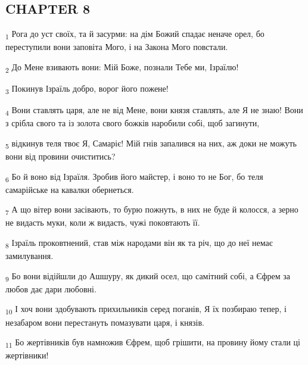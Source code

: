 \subsection{CHAPTER 8}
\begin{tcolorbox}
\textsubscript{1} Рога до уст своїх, та й засурми: на дім Божий спадає неначе орел, бо переступили вони заповіта Мого, і на Закона Мого повстали.
\end{tcolorbox}
\begin{tcolorbox}
\textsubscript{2} До Мене взивають вони: Мій Боже, познали Тебе ми, Ізраїлю!
\end{tcolorbox}
\begin{tcolorbox}
\textsubscript{3} Покинув Ізраїль добро, ворог його пожене!
\end{tcolorbox}
\begin{tcolorbox}
\textsubscript{4} Вони ставлять царя, але не від Мене, вони князя ставлять, але Я не знаю! Вони з срібла свого та із золота свого божків наробили собі, щоб загинути,
\end{tcolorbox}
\begin{tcolorbox}
\textsubscript{5} відкинув теля твоє Я, Самаріє! Мій гнів запалився на них, аж доки не можуть вони від провини очиститись?
\end{tcolorbox}
\begin{tcolorbox}
\textsubscript{6} Бо й воно від Ізраїля. Зробив його майстер, і воно то не Бог, бо теля самарійське на кавалки обернеться.
\end{tcolorbox}
\begin{tcolorbox}
\textsubscript{7} А що вітер вони засівають, то бурю пожнуть, в них не буде й колосся, а зерно не видасть муки, коли ж видасть, чужі поковтають її.
\end{tcolorbox}
\begin{tcolorbox}
\textsubscript{8} Ізраїль проковтнений, став між народами він як та річ, що до неї немає замилування.
\end{tcolorbox}
\begin{tcolorbox}
\textsubscript{9} Бо вони відійшли до Ашшуру, як дикий осел, що самітний собі, а Єфрем за любов дає дари любовні.
\end{tcolorbox}
\begin{tcolorbox}
\textsubscript{10} І хоч вони здобувають прихильників серед поганів, Я їх позбираю тепер, і незабаром вони перестануть помазувати царя, і князів.
\end{tcolorbox}
\begin{tcolorbox}
\textsubscript{11} Бо жертівників був намножив Єфрем, щоб грішити, на провину йому стали ці жертівники!
\end{tcolorbox}
